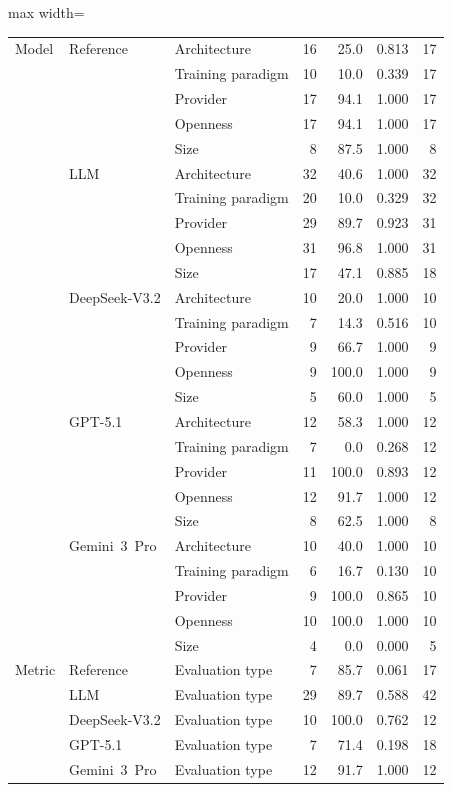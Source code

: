 \begin{table}[H]
\begin{adjustbox}{max width=\textwidth}
\begin{tabular}{l l l r r r r}
\addlinespace
Model & Reference & Architecture & 16 & 25.0 & 0.813 & 17 \\
 &  & Training paradigm & 10 & 10.0 & 0.339 & 17 \\
 &  & Provider & 17 & 94.1 & 1.000 & 17 \\
 &  & Openness & 17 & 94.1 & 1.000 & 17 \\
 &  & Size & 8 & 87.5 & 1.000 & 8 \\
 & LLM & Architecture & 32 & 40.6 & 1.000 & 32 \\
 &  & Training paradigm & 20 & 10.0 & 0.329 & 32 \\
 &  & Provider & 29 & 89.7 & 0.923 & 31 \\
 &  & Openness & 31 & 96.8 & 1.000 & 31 \\
 &  & Size & 17 & 47.1 & 0.885 & 18 \\
 & DeepSeek-V3.2 & Architecture & 10 & 20.0 & 1.000 & 10 \\
 &  & Training paradigm & 7 & 14.3 & 0.516 & 10 \\
 &  & Provider & 9 & 66.7 & 1.000 & 9 \\
 &  & Openness & 9 & 100.0 & 1.000 & 9 \\
 &  & Size & 5 & 60.0 & 1.000 & 5 \\
 & GPT-5.1 & Architecture & 12 & 58.3 & 1.000 & 12 \\
 &  & Training paradigm & 7 & 0.0 & 0.268 & 12 \\
 &  & Provider & 11 & 100.0 & 0.893 & 12 \\
 &  & Openness & 12 & 91.7 & 1.000 & 12 \\
 &  & Size & 8 & 62.5 & 1.000 & 8 \\
 & Gemini~3~Pro & Architecture & 10 & 40.0 & 1.000 & 10 \\
 &  & Training paradigm & 6 & 16.7 & 0.130 & 10 \\
 &  & Provider & 9 & 100.0 & 0.865 & 10 \\
 &  & Openness & 10 & 100.0 & 1.000 & 10 \\
 &  & Size & 4 & 0.0 & 0.000 & 5 \\
\addlinespace
Metric & Reference & Evaluation type & 7 & 85.7 & 0.061 & 17 \\
 & LLM & Evaluation type & 29 & 89.7 & 0.588 & 42 \\
 & DeepSeek-V3.2 & Evaluation type & 10 & 100.0 & 0.762 & 12 \\
 & GPT-5.1 & Evaluation type & 7 & 71.4 & 0.198 & 18 \\
 & Gemini~3~Pro & Evaluation type & 12 & 91.7 & 1.000 & 12 \\
\bottomrule
\end{tabular}
\end{adjustbox}
\end{table}
